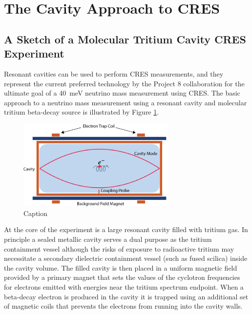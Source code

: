 \section{The Cavity Approach to CRES}
\label{sec:chap6-cavity-approach}

\subsection{A Sketch of a Molecular Tritium Cavity CRES Experiment}

Resonant cavities can be used to perform CRES measurements, and they represent the current preferred technology by the Project 8 collaboration for the ultimate goal of a 40~meV neutrino mass measurement using CRES. The basic approach to a neutrino mass measurement using a resonant cavity and molecular tritium beta-decay source is illustrated by Figure \ref{fig:chap6-cav-cartoon}.
\begin{figure}[htbp]
    \centering
    \includegraphics*[width=0.7\textwidth]{figs/Chapter-6/230606_cavity_cartoon.png}
    \caption{\label{fig:chap6-cav-cartoon} Caption}
\end{figure}

At the core of the experiment is a large resonant cavity filled with tritium gas. In principle a sealed metallic cavity serves a dual purpose as the tritium containment vessel although the risks of exposure to radioactive tritium may necessitate a secondary dielectric containment vessel (such as fused scilica) inside the cavity volume. The filled cavity is then placed in a uniform magnetic field provided by a primary magnet that sets the values of the cyclotron frequencies for electrons emitted with energies near the tritium spectrum endpoint. When a beta-decay electron is produced in the cavity it is trapped using an additional set of magnetic coils that prevents the electrons from running into the cavity walls.

